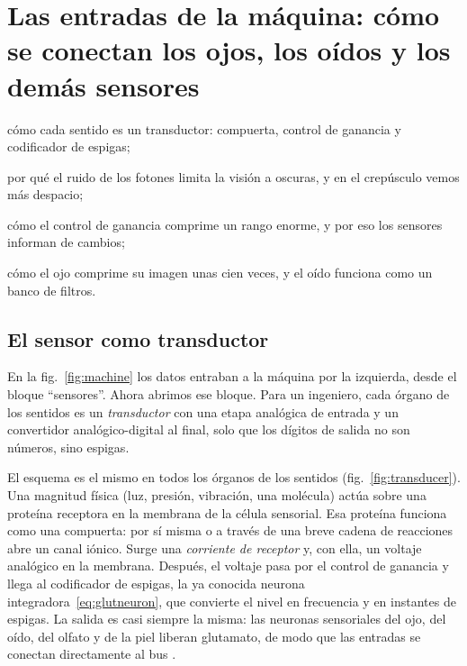 \chapter{Las entradas de la máquina: cómo se conectan los ojos, los oídos y los demás sensores}
\label{sec:sensors}
\begin{chaptergoals}
\item cómo cada sentido es un transductor: compuerta, control de ganancia y codificador de espigas;
\item por qué el ruido de los fotones limita la visión a oscuras, y en el crepúsculo vemos más despacio;
\item cómo el control de ganancia comprime un rango enorme, y por eso los sensores informan de cambios;
\item cómo el ojo comprime su imagen unas cien veces, y el oído funciona como un banco de filtros.
\end{chaptergoals}

\section{El sensor como transductor}

En la fig.~\ref{fig:machine} los datos entraban a la máquina por la izquierda, desde el bloque “sensores”. Ahora abrimos ese bloque. Para un ingeniero, cada órgano de los sentidos es un \emph{transductor} con una etapa analógica de entrada y un convertidor analógico-digital al final, solo que los dígitos de salida no son números, sino espigas.

El esquema es el mismo en todos los órganos de los sentidos (fig.~\ref{fig:transducer}). Una magnitud física (luz, presión, vibración, una molécula) actúa sobre una proteína receptora en la membrana de la célula sensorial. Esa proteína funciona como una compuerta: por sí misma o a través de una breve cadena de reacciones abre un canal iónico. Surge una \emph{corriente de receptor} y, con ella, un voltaje analógico en la membrana. Después, el voltaje pasa por el control de ganancia y llega al codificador de espigas, la ya conocida neurona integradora~\eqref{eq:glutneuron}, que convierte el nivel en frecuencia y en instantes de espigas. La salida es casi siempre la misma: las neuronas sensoriales del ojo, del oído, del olfato y de la piel liberan glutamato, de modo que las entradas se conectan directamente al bus .

